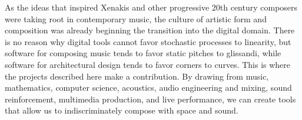 As the ideas that inspired Xenakis and other progressive 20th century
composers were taking root in contemporary music, the culture of
artistic form and composition was already beginning the transition
into the digital domain. There is no reason why digital tools cannot
favor stochastic processes to linearity, but software for composing
music tends to favor static pitches to glissandi, while software for
architectural design tends to favor corners to curves. This is where
the projects described here make a contribution.  By drawing from
music, mathematics, computer science, acoustics, audio engineering and
mixing, sound reinforcement, multimedia production, and live
performance, we can create tools that allow us to indiscriminately
compose with space and sound.

